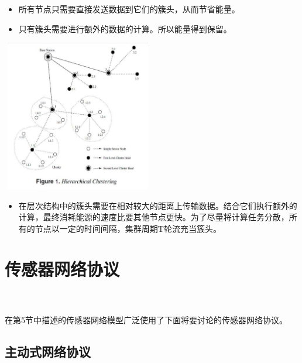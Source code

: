 \documentclass[journal]{IEEEtran}
\begin{document}
\begin{CJK}{UTF8}{gbsn}
\begin{itemize}
  \item 所有节点只需要直接发送数据到它们的簇头，从而节省能量。
  \item 只有簇头需要进行额外的数据的计算。所以能量得到保留。 
\end{itemize}
\noindent
\includegraphics[height=250, width=250]{1.eps}

\begin{itemize}
  \item 在层次结构中的簇头需要在相对较大的距离上传输数据。结合它们执行额外的计算，最终消耗能源的速度比要其他节点更快。为了尽量将计算任务分散，所有的节点以一定的时间间隔，集群周期T轮流充当簇头。

\end{itemize}

\section{\textbf{传感器网络协议\\ \\ }}

在第5节中描述的传感器网络模型广泛使用了下面将要讨论的传感器网络协议。

\subsection{\textbf{主动式网络协议}}


\end{CJK}
\end{document}
